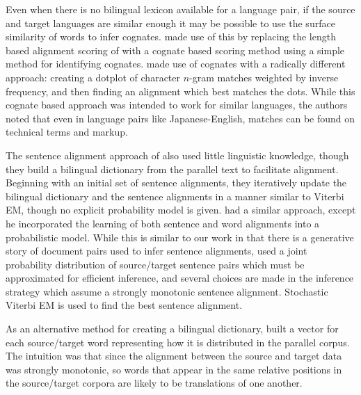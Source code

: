 Even when there is no bilingual lexicon available for a language pair, if the
source and target languages are similar enough it may be possible to use the
surface similarity of words to infer cognates. \citet{Simard93} made use of this
by replacing the length based alignment scoring of \citet{Gale93} with a cognate
based scoring method using a simple method for identifying cognates.
\citet{Church93} made use of cognates with a radically different approach:
creating a dotplot of character $n$-gram matches weighted by inverse frequency,
and then finding an alignment which best matches the dots. While this cognate
based approach was intended to work for similar languages, the authors noted
that even in language pairs like Japanese-English, matches can be found on
technical terms and markup.

The sentence alignment approach of \citet{Kay93} also used little linguistic
knowledge, though they build a bilingual dictionary from the parallel text to
facilitate alignment. Beginning with an initial set of sentence alignments, they
iteratively update the bilingual dictionary and the sentence alignments in a
manner similar to Viterbi EM, though no explicit probability model is given.
\citet{Chen93} had a similar approach, except he
incorporated the learning of both sentence and word alignments into a
probabilistic model. While this is similar to our work in that there is a
generative story of document pairs used to infer sentence alignments,
\citet{Chen93} used a joint probability distribution of source/target sentence
pairs which must be approximated for efficient inference, and several choices
are made in the inference strategy which assume a strongly monotonic sentence
alignment. Stochastic Viterbi EM is used to find the best sentence alignment.

As an alternative method for creating a bilingual dictionary, \citet{Fung94}
built a vector for each source/target word representing how it is distributed in
the parallel corpus. The intuition was that since the alignment between the
source and target data was strongly monotonic, so words that appear in the same
relative positions in the source/target corpora are likely to be translations of
one another.

